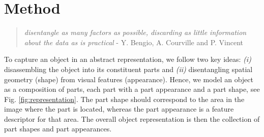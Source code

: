 \chapter{Method}

%
	\begin{quotation}
		\textit{disentangle as many factors as possible, discarding as little information about the data as is practical} - Y. Bengio, A. Courville and P. Vincent \cite{bengio}
	\end{quotation}
	To capture an object in an abstract representation, we follow two key ideas: \emph{(i)} disassembling the object into its constituent parts and \emph{(ii)} disentangling spatial geometry (shape) from visual features (appearance). Hence, we model an object as a composition of parts, each part with a part appearance and a part shape, see Fig. \ref{fig:representation}. The part shape should correspond to the area in the image where the part is located, whereas the part appearance is a feature descriptor for that area. The overall object representation is then the collection of part shapes and part appearances. \\
